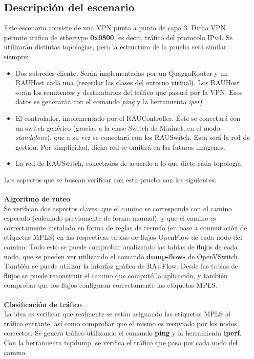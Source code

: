 \subsection{Descripción del escenario}
Este escenario consiste de una VPN punto a punto de capa 3. Dicha VPN permite tráfico de ethertype \textbf{0x0800}, es decir, tráfico del protocolo IPv4. Se utilizarán distintas topologias, pero la estructura de la prueba será similar siempre:
\begin{itemize}
	\item Dos subredes cliente. Serán implementadas por un QuaggaRouter y un RAUHost cada una (recordar las clases del entorno virtual). Los RAUHost serán los remitentes y destinatarios del tráfico que pasará por la VPN. Esos datos se generarán con el comando \textit{ping} y la herramienta \textit{iperf}.
	\item El controlador, implementado por el RAUController. Éste se conectará con un switch genérico (gracias a la clase Switch de Mininet, en el modo \textit{standalone}), que a su vez se conectará con los RAUSwitch. Esta será la red de gestión. Por simplicidad, dicha red se omitirá en las futuras imágenes.
	\item La red de RAUSwitch, conectados de acuerdo a lo que dicte cada topología.
\end{itemize}
Los aspectos que se buscan verificar con esta prueba son los siguientes: \\ \\
\textbf{Algoritmo de ruteo} \\
 Se verifican dos aspectos claves: que el camino se corresponde con el camino esperado (calculado previamente de forma manual), y que el camino es correctamente instalado en forma de reglas de reenvío (en base a conmutación de etiquetas MPLS) en las respectivas tablas de flujos OpenFlow de cada nodo del camino. Todo esto se puede comprobar analizando las tablas de flujos de cada nodo, que se pueden ver utilizando el comando \textbf{dump-flows} de OpenVSwitch. También se puede utilizar la interfaz gráfica de RAUFlow. Desde las tablas de flujos se puede reconstruir el camino que computó la aplicación, y también comprobar que los flujos configuran correctamente las etiquetas MPLS. \\ \\
\textbf{Clasificación de tráfico} \\
La idea es verificar que realmente se están asignando las etiquetas MPLS al tráfico entrante, así como comprobar que el mismo es reenviado por los nodos correctos. Se genera tráfico utilizando el comando \textbf{ping} y la herramienta \textbf{iperf}. Con la herramienta tcpdump, se verifica el tráfico que pasa por cada nodo del camino. \\ \\
